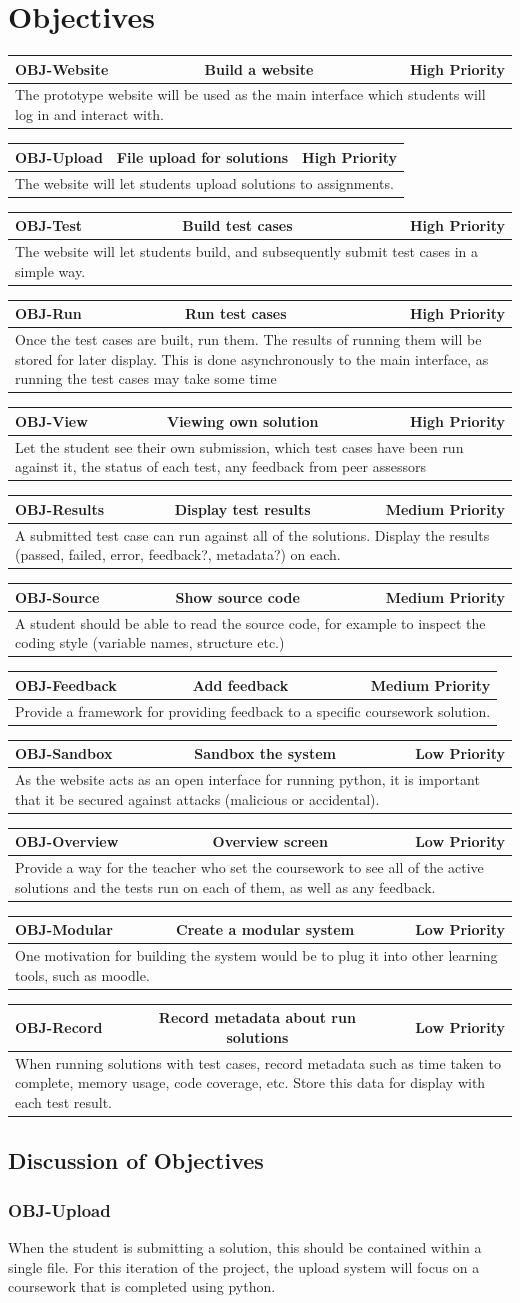 \documentclass[a4paper,11pt]{report}
\newcommand{\objitem}[4]{\begin{tabularx}{\textwidth}{|l|cr|} \hline \textbf{OBJ-#1} & #2 & #3 \\ \hline \multicolumn{3}{|X|}{#4} \\ \hline \end{tabularx}}
\begin{document}
\section{Objectives}
\objitem{Website}{Build a website}{High Priority}{The prototype website will be used as the main interface which students will log in and interact with.}
\objitem{Upload}{File upload for solutions}{High Priority}{The website will let students upload solutions to assignments.}
\objitem{Test}{Build test cases}{High Priority}{The website will let students build, and subsequently submit test cases in a simple way.}
\objitem{Run}{Run test cases}{High Priority}{Once the test cases are built, run them. The results of running them will be stored for later display. This is done asynchronously to the main interface, as running the test cases may take some time}
\objitem{View}{Viewing own solution}{High Priority}{Let the student see their own submission, which test cases have been run against it, the status of each test, any feedback from peer assessors}
\objitem{Results}{Display test results}{Medium Priority}{A submitted test case can run against all of the solutions. Display the results (passed, failed, error, feedback?, metadata?) on each.}
\objitem{Source}{Show source code}{Medium Priority}{A student should be able to read the source code, for example to inspect the coding style (variable names, structure etc.)}
\objitem{Feedback}{Add feedback}{Medium Priority}{Provide a framework for providing feedback to a specific coursework solution.}
\objitem{Sandbox}{Sandbox the system}{Low Priority}{As the website acts as an open interface for running python, it is important that it be secured against attacks (malicious or accidental).}
\objitem{Overview}{Overview screen}{Low Priority}{Provide a way for the teacher who set the coursework to see all of the active solutions and the tests run on each of them, as well as any feedback.}
\objitem{Modular}{Create a modular system}{Low Priority}{One motivation for building the system would be to plug it into other learning tools, such as moodle.}
\objitem{Record}{Record metadata about run solutions}{Low Priority}{When running solutions with test cases, record metadata such as time taken to complete, memory usage, code coverage, etc. Store this data for display with each test result.}

\subsection{Discussion of Objectives}
\subsubsection*{OBJ-Upload}
When the student is submitting a solution, this should be contained within a single file. For this iteration of the project, the upload system will focus on a coursework that is completed using python.
\end{document}
